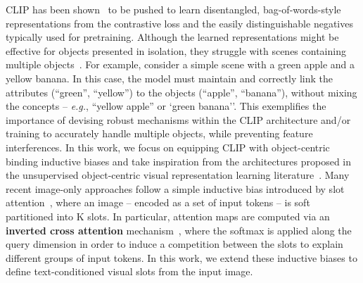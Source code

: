 CLIP has been shown~\citep{yuksekgonul2023visionlanguagemodelsbehavelike} to be pushed to learn disentangled, bag-of-words-style representations from the contrastive loss and the easily distinguishable negatives typically used for pretraining. Although the learned representations might be effective for objects presented in isolation, they struggle with scenes containing multiple objects~\citep{tang2023when}. For example, consider a simple scene with a green apple and a yellow banana. In this case, the model must maintain and correctly link the attributes (``green'', ``yellow'') to the objects (``apple'', ``banana''), without mixing the concepts  -- \textit{e.g.}, ``yellow apple'' or `green banana''. This exemplifies the importance of devising robust mechanisms within the CLIP architecture and/or training to accurately handle multiple objects, while preventing feature interferences. 
In this work, we focus on equipping CLIP with object-centric binding inductive biases and take inspiration from the architectures proposed in the unsupervised object-centric visual representation learning literature~\citep{
locatello2020objectcentriclearningslotattention,wu2023slotdiffusionobjectcentricgenerativemodeling,seitzer2023bridginggaprealworldobjectcentric,pmlr-v177-assouel22a}. Many recent image-only approaches follow a simple inductive bias introduced by slot attention~\citep{locatello2020objectcentriclearningslotattention}, where  an image -- encoded as a set of input tokens -- is soft partitioned into
K slots. In particular, attention maps are computed via an \textbf{inverted cross attention} mechanism~\citep{WuInvertedAttentionTC}, where the softmax is applied along the query dimension in order to induce a competition between the slots to explain different groups of input tokens. In this work, we extend these inductive biases to define text-conditioned visual slots from the input image.